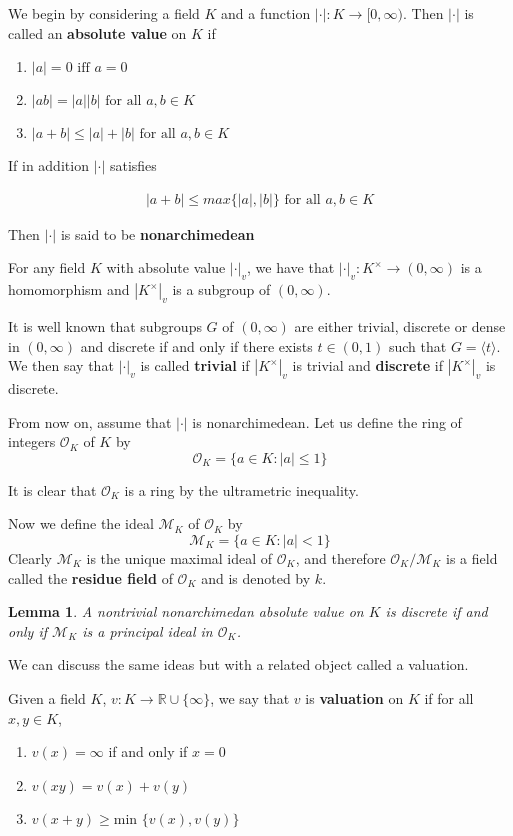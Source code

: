 \documentclass{amsart}
\newtheorem{lem}[thm]{Lemma}
\newcommand{\MCM}{\mathcal{M}}
\newcommand{\MCO}{\mathcal{O}}
\begin{document}
We begin by considering a field $K$ and a function $|\cdot|: K \to [0,\infty)$. Then $|\cdot|$ is called an \textbf{absolute value} on $K$ if 

\begin{enumerate}
\item  $|a| = 0 \text{ iff } a = 0 $
\item $|ab| = |a||b| \text{ for all } a,b \in K$
\item $ |a+b| \leq |a|+|b| \text{ for all } a,b \in K$
\end{enumerate}
If in addition $|\cdot|$ satisfies 

\begin{align*}
|a+b| \leq max\{|a|,|b|\} \text{ for all } a,b \in K
\end{align*}

\noindent Then $|\cdot|$ is said to be \textbf{nonarchimedean}


For any field $K$ with absolute value $|\cdot |_v$, we have that $| \cdot |_v:K^{\times}\rightarrow (0 , \infty)$ is a homomorphism and $|K^{\times}|_v$ is a subgroup of $(0, \infty)$. 

It is well known that subgroups $G$ of $(0, \infty)$ are either trivial, discrete or dense in $(0,\infty)$ and discrete if and only if there exists $t \in (0,1)$ such that $G=\langle t \rangle$. We then say that $|\cdot|_v$ is called \textbf{trivial} if $|K^{\times}|_v$ is trivial and \textbf{discrete} if $|K^{\times}|_v$ is discrete.

From now on, assume that $|\cdot|$ is nonarchimedean. Let us define the ring of integers $\MCO_K$ of $K$ by 
$$\MCO_K=\{a \in K : |a| \leq 1\}$$ 

\noindent It is clear that $\MCO_K$ is a ring by the ultrametric inequality. 

\noindent Now we define the ideal $\MCM_K$ of $\MCO_K$ by
$$\MCM_K=\{a \in K : |a|< 1\}$$
Clearly $\MCM_K$ is the unique maximal ideal of $\MCO_K$, and therefore $\MCO_K/\MCM_K$ is a field called the \textbf{residue field} of $\MCO_K$ and is denoted by $k$.  

\begin{lem}
A nontrivial nonarchimedan absolute value on $K$ is discrete if and only if $\MCM_K$ is a principal ideal in $\MCO_K$. 
\end{lem}

We can discuss the same ideas but with a related object called a valuation. 

Given a field $K$, $v: K \rightarrow \mathbb{R} \cup \{\infty\}$, we say that $v$ is \textbf{valuation} on $K$ if for all $x,y \in K$, 
\begin{enumerate}
\item $v(x)=\infty$ if and only if $x=0$
\item $v(xy)=v(x)+v(y)$
\item $v(x+y)\geq \text{min } \{v(x),v(y)\}$
\end{enumerate}
\end{document}
